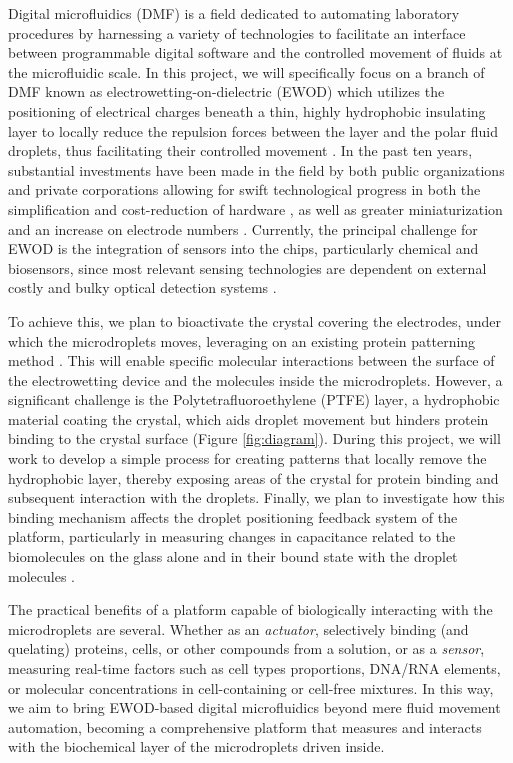 \documentclass[8pt, twocolumn]{article}
\begin{document}
Digital microfluidics (DMF) is a field dedicated to automating laboratory procedures by harnessing a variety of technologies to facilitate an interface between programmable digital software and the controlled movement of fluids at the microfluidic scale.  In this project, we will specifically focus on a branch of DMF known as electrowetting-on-dielectric (EWOD) which utilizes the positioning of electrical charges beneath a thin, highly hydrophobic insulating layer to locally reduce the repulsion forces between the layer and the polar fluid droplets, thus facilitating their controlled movement \cite{beniContinuousElectrowettingEffect1982}. In the past ten years, substantial investments have been made in the field by both public organizations and private corporations \cite{liCurrentCommercializationStatus2020} allowing for swift technological progress in both the simplification and cost-reduction of hardware \cite{zhang2DLargescaleEWOD2020}, as well as greater miniaturization and an increase on electrode numbers \cite{qinSolutionMassProduction2021}. Currently, the principal challenge for EWOD is the integration of sensors into the chips, particularly chemical and biosensors, since most relevant sensing technologies are dependent on external costly and bulky optical detection systems \cite{huAllinOneDigitalMicrofluidics2022}.

To achieve this, we plan to bioactivate the crystal covering the electrodes, under which the microdroplets moves, leveraging on an existing protein patterning method \cite{straleMultiproteinPrintingLightInduced2016}. This will enable specific molecular interactions between the surface of the electrowetting device and the molecules inside the microdroplets. However, a significant challenge is the Polytetrafluoroethylene (PTFE) layer, a hydrophobic material coating the crystal, which aids droplet movement but hinders protein binding to the crystal surface (Figure \ref{fig:diagram}). During this project, we will work to develop a simple process for creating patterns that locally remove the hydrophobic layer, thereby exposing areas of the crystal for protein binding and subsequent interaction with the droplets. Finally, we plan to investigate how this binding mechanism affects the droplet positioning feedback system of the platform, particularly in measuring changes in capacitance related to the biomolecules on the glass alone and in their bound state with the droplet molecules \cite{wangUltraSensitiveCapacitiveMicrowire2019}.

The practical benefits of a platform capable of biologically interacting with the microdroplets are several. Whether as an \textit{actuator}, selectively binding (and quelating) proteins, cells, or other compounds from a solution, or as a \textit{sensor}, measuring real-time factors such as cell types proportions, DNA/RNA elements, or molecular concentrations in cell-containing or cell-free mixtures. In this way, we aim to bring EWOD-based digital microfluidics beyond mere fluid movement automation, becoming a comprehensive platform that measures and interacts with the biochemical layer of the microdroplets driven inside.
\end{document}

